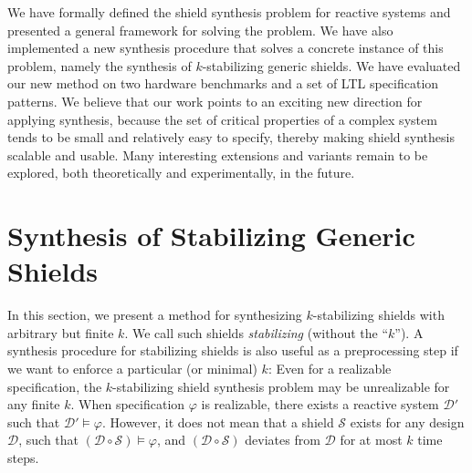 \documentclass{llncs}
\newcommand{\design}{\mathcal{D}}
\newcommand{\shield}{\mathcal{S}}
\newcommand{\spec}{\varphi}
\newcommand{\comp}{\circ}
\newif \ifextended
\begin{document}
We have formally defined the shield synthesis problem for reactive 
systems and presented a general framework for solving the problem.  We 
have also implemented a new synthesis procedure that solves  a concrete 
instance of  this problem, namely the synthesis of $k$-stabilizing 
generic shields. We have evaluated our new method  on two hardware 
benchmarks and a set of LTL specification patterns.  We believe that our 
work points to an exciting new direction for applying synthesis, because 
the set of critical properties of a complex system tends to be small and 
relatively easy to specify, thereby making shield synthesis scalable and 
usable. Many interesting extensions and variants remain to be explored, 
both theoretically and experimentally, in the future.


\ifextended
\newpage
\appendix

\section{Synthesis of Stabilizing Generic Shields}
\label{sec:app}

In this section, we present a method for synthesizing $k$-stabilizing 
shields with arbitrary but finite $k$.  We call such shields 
\emph{stabilizing} (without the ``$k$'').  A synthesis procedure for 
stabilizing shields is also useful as a preprocessing step if we want to 
enforce a particular (or minimal) $k$: Even for a realizable 
specification, the $k$-stabilizing shield synthesis problem may be 
unrealizable for any finite $k$.  When specification $\spec$ is 
realizable, there exists a reactive system $\design'$ such that 
$\design' \models \spec$.  However, it does not mean that a shield 
$\shield$ exists for any design $\design$, such that $(\design \comp 
\shield) \models \spec$, and $(\design \comp \shield)$ deviates from 
$\design$ for at most $k$ time steps.
\end{document}

